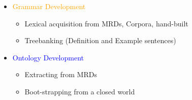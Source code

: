 \documentclass[a4paper,landscape,headrule,footrule,xetex]{foils}
\newcommand{\ont}[1]{\textcolor{blue}{#1}}
\newcommand{\jcy}[1]{\textcolor{orange}{#1}}
\begin{document}
\begin{small}
  \begin{itemize}
  \item \jcy{Grammar Development}
    \begin{itemize}
    \item Lexical acquisition from MRDs, Corpora, hand-built
    \item Treebanking (Definition and Example sentences)
    \end{itemize}
  \item \ont{Ontology Development}
    \begin{itemize}
    \item Extracting from MRDs
    \item Boot-strapping from a closed world
    \end{itemize}
  \end{itemize}
\end{small}
\vspace*{-10mm}
\newcommand{\SB}[1]{\psshadowbox[linecolor=yellow]{#1}}
\end{document}
